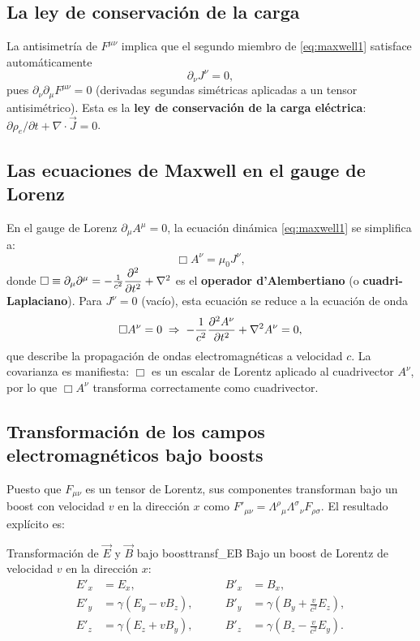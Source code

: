 \subsection{La ley de conservación de la carga}

La antisimetría de $F^{\mu\nu}$ implica que el segundo miembro de \eqref{eq:maxwell1} satisface automáticamente
\begin{equation}
  \partial_\nu J^\nu = 0,
  \label{eq:conserv_carga}
\end{equation}
pues $\partial_\nu\partial_\mu F^{\mu\nu} = 0$ (derivadas segundas simétricas aplicadas a un tensor antisimétrico). Esta es la \textbf{ley de conservación de la carga eléctrica}: $\partial\rho_e/\partial t + \nabla\cdot\vec{J} = 0$.

\subsection{Las ecuaciones de Maxwell en el gauge de Lorenz}

En el gauge de Lorenz $\partial_\mu A^\mu = 0$, la ecuación dinámica \eqref{eq:maxwell1} se simplifica a:
\begin{equation}
  \Box A^\nu = \mu_0 J^\nu,
  \label{eq:ondas_EM}
\end{equation}
donde $\Box \equiv \partial_\mu\partial^\mu = -\frac{1}{c^2}\dfrac{\partial^2 }{\partial t^2} + \nabla^2$ es el \textbf{operador d'Alembertiano} (o \textbf{cuadri-Laplaciano}). Para $J^\nu = 0$ (vacío), esta ecuación se reduce a la ecuación de onda
\[
  \Box A^\nu = 0 \;\Rightarrow\; -\frac{1}{c^2}\dfrac{\partial^2 A^\nu}{\partial t^2} + \nabla^2 A^\nu = 0,
\]
que describe la propagación de ondas electromagnéticas a velocidad $c$. La covarianza es manifiesta: $\Box$ es un escalar de Lorentz aplicado al cuadrivector $A^\nu$, por lo que $\Box A^\nu$ transforma correctamente como cuadrivector.

\subsection{Transformación de los campos electromagnéticos bajo boosts}

Puesto que $F_{\mu\nu}$ es un tensor de Lorentz, sus componentes transforman bajo un boost con velocidad $v$ en la dirección $x$ como $F'_{\mu\nu} = \Lambda^\rho{}_\mu \Lambda^\sigma{}_\nu F_{\rho\sigma}$. El resultado explícito es:

\begin{proposicion}{Transformación de $\vec{E}$ y $\vec{B}$ bajo boost}{transf_EB}
Bajo un boost de Lorentz de velocidad $v$ en la dirección $x$:
\begin{align}
  E'_x &= E_x, \qquad & B'_x &= B_x, \label{eq:EB_transf_long}\\
  E'_y &= \gamma(E_y - vB_z), \qquad & B'_y &= \gamma\!\left(B_y + \frac{v}{c^2}E_z\right), \label{eq:EB_transf_trans1}\\
  E'_z &= \gamma(E_z + vB_y), \qquad & B'_z &= \gamma\!\left(B_z - \frac{v}{c^2}E_y\right). \label{eq:EB_transf_trans2}
\end{align}
\end{proposicion}

